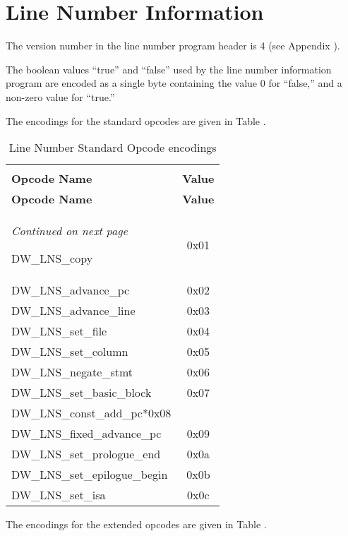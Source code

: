 \section{Line Number Information}
\label{datarep:linenumberinformation}

The version number in the line number program header is 4
(see Appendix ). 

The boolean values ``true'' and ``false'' 
used by the line number information program are encoded
as a single byte containing the value 0 
for ``false,'' and a non-zero value for ``true.''

The encodings for the standard opcodes are given in 
Table .

\begin{centering}
\setlength{\extrarowheight}{0.1cm}
\begin{longtable}{l|c}
  \caption{Line Number Standard Opcode encodings} \label{tab:linenumberstandardopcodeencodings}\\
  \hline \\ \bfseries Opcode Name&\bfseries Value \\ \hline
\endfirsthead
  \bfseries Opcode Name&\bfseries Value\\ \hline
\endhead
  \hline \emph{Continued on next page}
\endfoot
  \hline
\endlastfoot

DW\_LNS\_copy&0x01 \\
DW\_LNS\_advance\_pc&0x02 \\
DW\_LNS\_advance\_line&0x03 \\
DW\_LNS\_set\_file&0x04 \\
DW\_LNS\_set\_column&0x05 \\
DW\_LNS\_negate\_stmt&0x06 \\
DW\_LNS\_set\_basic\_block&0x07 \\
DW\_LNS\_const\_add\_pc*0x08 \\
DW\_LNS\_fixed\_advance\_pc&0x09 \\
DW\_LNS\_set\_prologue\_end&0x0a \\
DW\_LNS\_set\_epilogue\_begin&0x0b \\
DW\_LNS\_set\_isa&0x0c \\

\end{longtable}
\end{centering}


The encodings for the extended opcodes are given in 
Table .

